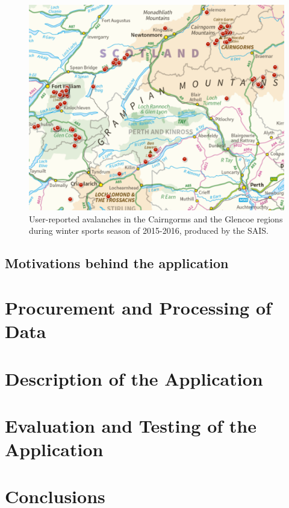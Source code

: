 \documentclass[openany]{UoYCSproject}
\begin{document}
\begin{figure}[h]
		\centering
		\includegraphics[scale=0.4]{ScotAvalanches1516.png}
		\caption{\label{fig:scotava1516} User-reported avalanches in the Cairngorms and the Glencoe regions during winter sports season of 2015-2016, produced by the SAIS.\cite{sais-map}}
\end{figure}

\section{Motivations behind the application}

\chapter{Procurement and Processing of Data} \label{ch:data}

\chapter{Description of the Application} \label{ch:app-description}

\chapter{Evaluation and Testing of the Application} \label{ch:app-testing}

\chapter{Conclusions} \label{ch:conclusions}

\small{}
\end{document}
